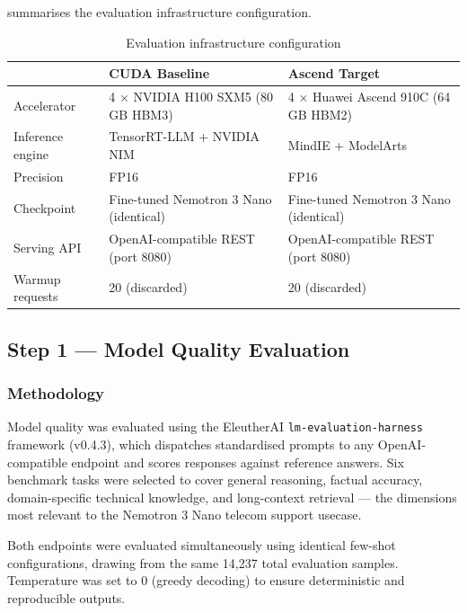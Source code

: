  summarises the evaluation infrastructure
configuration.

\begin{table}[htbp]
  \centering
  \caption{Evaluation infrastructure configuration}
  \label{tab:eval-setup}
  \begin{tabularx}{\textwidth}{lXX}
    \toprule
    \tableheader{Parameter & CUDA Baseline & Ascend Target} \\
    \midrule
    Accelerator
      & 4 × NVIDIA H100 SXM5 (80 GB HBM3)
      & 4 × Huawei Ascend 910C (64 GB HBM2) \\
    \rowcolor{TableRowOdd}
    Inference engine
      & TensorRT-LLM + NVIDIA NIM
      & MindIE + ModelArts \\
    Precision
      & FP16
      & FP16 \\
    \rowcolor{TableRowOdd}
    Checkpoint
      & Fine-tuned Nemotron 3 Nano (identical)
      & Fine-tuned Nemotron 3 Nano (identical) \\
    Serving API
      & OpenAI-compatible REST (port 8080)
      & OpenAI-compatible REST (port 8080) \\
    \rowcolor{TableRowOdd}
    Warmup requests
      & 20 (discarded)
      & 20 (discarded) \\
    \bottomrule
  \end{tabularx}
\end{table}

\subsection{Step 1 — Model Quality Evaluation}
\label{sec:qa-evaluation}

\subsubsection{Methodology}

Model quality was evaluated using the EleutherAI
\texttt{lm-evaluation-harness} framework (v0.4.3), which
dispatches standardised prompts to any OpenAI-compatible
endpoint and scores responses against reference answers.
Six benchmark tasks were selected to cover general reasoning,
factual accuracy, domain-specific technical knowledge, and
long-context retrieval — the dimensions most relevant to
the Nemotron 3 Nano telecom support usecase.

Both endpoints were evaluated simultaneously using identical
few-shot configurations, drawing from the same 14,237 total
evaluation samples. Temperature was set to 0 (greedy decoding)
to ensure deterministic and reproducible outputs.

